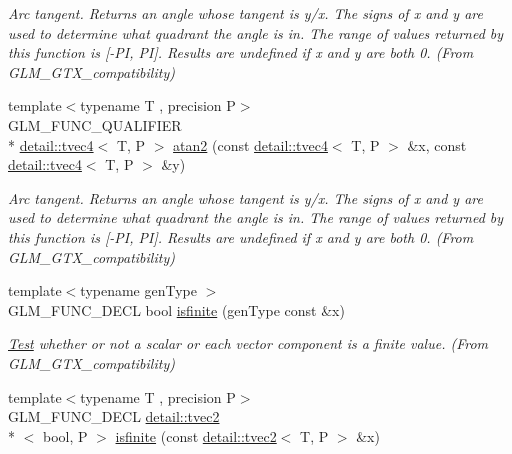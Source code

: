 \begin{DoxyCompactItemize}
\begin{DoxyCompactList}\small\item\em Arc tangent. Returns an angle whose tangent is y/x. The signs of x and y are used to determine what quadrant the angle is in. The range of values returned by this function is \mbox{[}-\/\-P\-I, P\-I\mbox{]}. Results are undefined if x and y are both 0. (From G\-L\-M\-\_\-\-G\-T\-X\-\_\-compatibility) \end{DoxyCompactList}\item 
\hypertarget{group__gtx__compatibility_ga3b9f0577d1b5d76c0f6ab04e28599fc4}{{\footnotesize template$<$typename T , precision P$>$ }\\G\-L\-M\-\_\-\-F\-U\-N\-C\-\_\-\-Q\-U\-A\-L\-I\-F\-I\-E\-R \\*
\hyperlink{structglm_1_1detail_1_1tvec4}{detail\-::tvec4}$<$ T, P $>$ \hyperlink{group__gtx__compatibility_ga3b9f0577d1b5d76c0f6ab04e28599fc4}{atan2} (const \hyperlink{structglm_1_1detail_1_1tvec4}{detail\-::tvec4}$<$ T, P $>$ \&x, const \hyperlink{structglm_1_1detail_1_1tvec4}{detail\-::tvec4}$<$ T, P $>$ \&y)}\label{group__gtx__compatibility_ga3b9f0577d1b5d76c0f6ab04e28599fc4}

\begin{DoxyCompactList}\small\item\em Arc tangent. Returns an angle whose tangent is y/x. The signs of x and y are used to determine what quadrant the angle is in. The range of values returned by this function is \mbox{[}-\/\-P\-I, P\-I\mbox{]}. Results are undefined if x and y are both 0. (From G\-L\-M\-\_\-\-G\-T\-X\-\_\-compatibility) \end{DoxyCompactList}\item 
\hypertarget{group__gtx__compatibility_gaf4b04dcd3526996d68c1bfe17bfc8657}{{\footnotesize template$<$typename gen\-Type $>$ }\\G\-L\-M\-\_\-\-F\-U\-N\-C\-\_\-\-D\-E\-C\-L bool \hyperlink{group__gtx__compatibility_gaf4b04dcd3526996d68c1bfe17bfc8657}{isfinite} (gen\-Type const \&x)}\label{group__gtx__compatibility_gaf4b04dcd3526996d68c1bfe17bfc8657}

\begin{DoxyCompactList}\small\item\em \hyperlink{class_test}{Test} whether or not a scalar or each vector component is a finite value. (From G\-L\-M\-\_\-\-G\-T\-X\-\_\-compatibility) \end{DoxyCompactList}\item 
\hypertarget{group__gtx__compatibility_ga604f38239da3a5b5b1e4fe06dec7f64d}{{\footnotesize template$<$typename T , precision P$>$ }\\G\-L\-M\-\_\-\-F\-U\-N\-C\-\_\-\-D\-E\-C\-L \hyperlink{structglm_1_1detail_1_1tvec2}{detail\-::tvec2}\\*
$<$ bool, P $>$ \hyperlink{group__gtx__compatibility_ga604f38239da3a5b5b1e4fe06dec7f64d}{isfinite} (const \hyperlink{structglm_1_1detail_1_1tvec2}{detail\-::tvec2}$<$ T, P $>$ \&x)}\label{group__gtx__compatibility_ga604f38239da3a5b5b1e4fe06dec7f64d}


\end{DoxyCompactItemize}
